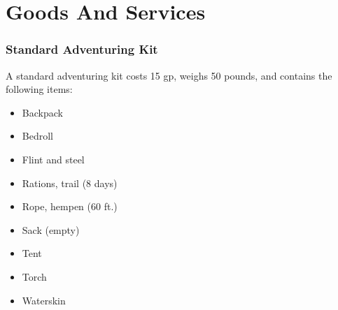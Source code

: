 \section{Goods And Services}

    \subsubsection{Standard Adventuring Kit}
        A standard adventuring kit costs 15 gp, weighs 50 pounds, and contains the following items:
        \begin{itemize}
            \item Backpack
            \item Bedroll
            \item Flint and steel
            \item Rations, trail (8 days)
            \item Rope, hempen (60 ft.)
            \item Sack (empty)
            \item Tent
            \item Torch
            \item Waterskin
        \end{itemize}

